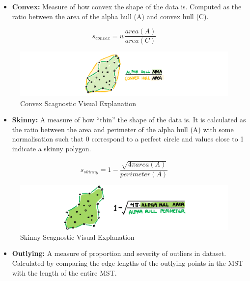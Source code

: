 \begin{itemize}
\tightlist
\item
  \textbf{Convex:} Measure of how convex the shape of the data is.
  Computed as the ratio between the area of the alpha hull (A) and
  convex hull (C).
\end{itemize}

\[s_{convex}=w\frac{area(A)}{area(C)}\]

\begin{Schunk}
\begin{figure}
\includegraphics[width=1\linewidth,height=0.2\textheight]{figures/drawconvex} \caption[Convex Scagnostic Visual Explanation]{Convex Scagnostic Visual Explanation}\label{fig:convexscag}
\end{figure}
\end{Schunk}

\begin{itemize}
\tightlist
\item
  \textbf{Skinny:} A measure of how ``thin'' the shape of the data is.
  It is calculated as the ratio between the area and perimeter of the
  alpha hull (A) with some normalisation such that 0 correspond to a
  perfect circle and values close to 1 indicate a skinny polygon.
\end{itemize}

\[s_{skinny}= 1-\frac{\sqrt{4\pi area(A)}}{perimeter(A)}\]

\begin{Schunk}
\begin{figure}
\includegraphics[width=1\linewidth,height=0.2\textheight]{figures/drawskinny} \caption[Skinny Scagnostic Visual Explanation]{Skinny Scagnostic Visual Explanation}\label{fig:skinnyscag}
\end{figure}
\end{Schunk}

\begin{itemize}
\tightlist
\item
  \textbf{Outlying:} A measure of proportion and severity of outliers in
  dataset. Calculated by comparing the edge lengths of the outlying
  points in the MST with the length of the entire MST.
\end{itemize}

